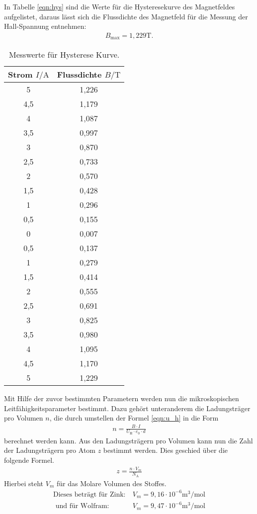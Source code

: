 In Tabelle \ref{eqn:hys} sind die Werte für die Hysteresekurve des Magnetfeldes aufgelistet, daraus lässt sich die Flussdichte des Magnetfeld
für die Messung der Hall-Spannung entnehmen:
\begin{align*}
 B_\mathrm{max}=1,229\si{\tesla}.
\end{align*}
\begin{table}
  \centering
  \caption{Messwerte für Hysterese Kurve.}
  \label{tab:hys}
  \begin{tabular}{c c}
    \toprule
    Strom $I/\si{\ampere}$ & Flussdichte $B/\si{\tesla}$\\
    \midrule
    5     &  1,226 \\
    4,5   &  1,179 \\
    4     &  1,087 \\
    3,5   &  0,997 \\
    3     &  0,870 \\
    2,5   &  0,733 \\
    2     &  0,570 \\
    1,5   &  0,428 \\
    1     &  0,296 \\
    0,5   &  0,155 \\
    0     &  0,007 \\
    0,5   &  0,137 \\
    1     &  0,279 \\
    1,5   &  0,414 \\
    2     &  0,555 \\
    2,5   &  0,691 \\
    3     &  0,825 \\
    3,5   &  0,980 \\
    4     &  1,095 \\
    4,5   &  1,170 \\
    5     &  1,229 \\
    \bottomrule
  \end{tabular}
\end{table}

Mit Hilfe der zuvor bestimmten Parametern werden nun die mikroskopischen Leitfähigkeitsparameter
bestimmt.
Dazu gehört unteranderem die Ladungsträger pro Volumen $n$, die durch umstellen der Formel \eqref{eqn:u_h} in die Form
\begin{align}
  n=\frac{B \cdot I}{U_\mathrm{H}\cdot e_0 \cdot d}
\end{align}
berechnet werden kann.
Aus den Ladungsträgern pro Volumen kann nun die Zahl der Ladungsträgern pro Atom $z$
bestimmt werden. Dies geschied über die folgende Formel.
\begin{align}
  z=\frac{n \cdot V_m}{N_\mathrm{A}}
\end{align}
Hierbei steht $V_m$ für das Molare Volumen des Stoffes.
\begin{align*}
\text{Dieses beträgt für Zink:}& \ V_m=9,16\cdot10^{-6}\si{\meter\tothe{3}\per\mol}\\
\text{ und für Wolfram}:& \ V_m=9,47\cdot10^{-6}\si{\meter\tothe{3}\per\mol}
\end{align*}

